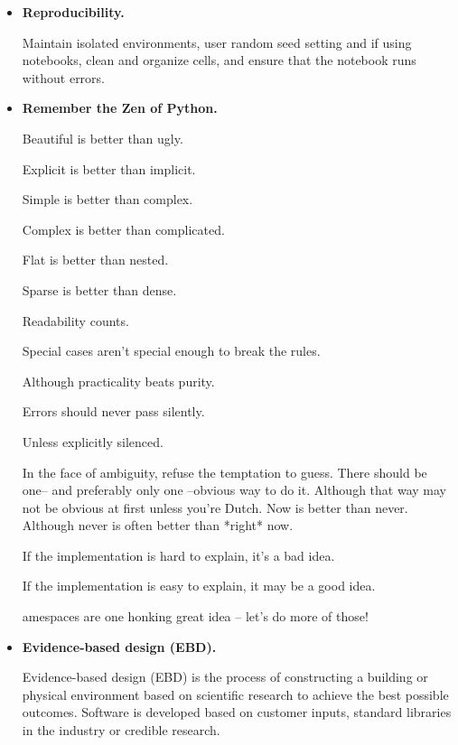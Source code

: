 \begin{itemize}
    \item \textbf{Reproducibility.}
    
    \noindent
    Maintain isolated environments, user random seed setting and
    if using notebooks, clean and organize cells, and ensure that
    the notebook runs without errors.


    
    \item \textbf{Remember the Zen of Python.}
    
    Beautiful is better than ugly.

    Explicit is better than implicit. 

    Simple is better than complex.

    Complex is better than complicated.

    Flat is better than nested.

    Sparse is better than dense.

    Readability counts.

    Special cases aren't special enough to break the rules.
    
    Although practicality beats purity.

    Errors should never pass silently.

    Unless explicitly silenced.

    In the face of ambiguity, refuse the temptation to guess.
    There should be one-- and preferably only one --obvious way to do it.
    Although that way may not be obvious at first unless you're Dutch.
    Now is better than never.
    Although never is often better than *right* now.
    
    If the implementation is hard to explain, it's a bad idea.
    
    If the implementation is easy to explain, it may be a good idea.
    
    amespaces are one honking great idea -- let's do more of those!
 
    

    \item \textbf{Evidence-based design (EBD).}
    
    \noindent
    Evidence-based design (EBD) is the process of constructing a
    building or physical environment based on scientific research
    to achieve the best possible outcomes. Software is developed
    based on customer inputs, standard libraries in the industry
    or credible research.




\end{itemize}
